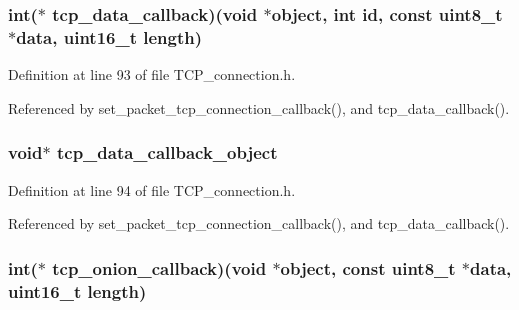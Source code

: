 \hypertarget{struct_t_c_p___connections_a925f83cd475679a15e0510ad5b02a581}{
\subsubsection[{tcp\+\_\+data\+\_\+callback}]{\setlength{\rightskip}{0pt plus 5cm}int($\ast$ tcp\+\_\+data\+\_\+callback)(void $\ast$object, int id, const uint8\+\_\+t $\ast$data, uint16\+\_\+t length)}}\label{struct_t_c_p___connections_a925f83cd475679a15e0510ad5b02a581}


Definition at line 93 of file T\+C\+P\+\_\+connection.\+h.



Referenced by set\+\_\+packet\+\_\+tcp\+\_\+connection\+\_\+callback(), and tcp\+\_\+data\+\_\+callback().

\hypertarget{struct_t_c_p___connections_a7374235c800f886578e032a878618568}{
\subsubsection[{tcp\+\_\+data\+\_\+callback\+\_\+object}]{\setlength{\rightskip}{0pt plus 5cm}void$\ast$ tcp\+\_\+data\+\_\+callback\+\_\+object}}\label{struct_t_c_p___connections_a7374235c800f886578e032a878618568}


Definition at line 94 of file T\+C\+P\+\_\+connection.\+h.



Referenced by set\+\_\+packet\+\_\+tcp\+\_\+connection\+\_\+callback(), and tcp\+\_\+data\+\_\+callback().

\hypertarget{struct_t_c_p___connections_ad92f3faa26e9b50df859c26416692b01}{
\subsubsection[{tcp\+\_\+onion\+\_\+callback}]{\setlength{\rightskip}{0pt plus 5cm}int($\ast$ tcp\+\_\+onion\+\_\+callback)(void $\ast$object, const uint8\+\_\+t $\ast$data, uint16\+\_\+t length)}}\label{struct_t_c_p___connections_ad92f3faa26e9b50df859c26416692b01}


